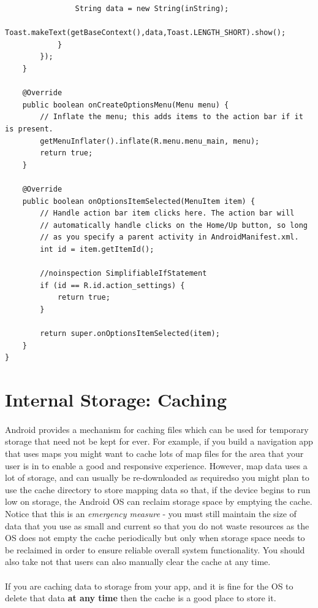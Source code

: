 \documentclass[12pt, a4paper, twoside]{book}
\begin{document}
\begin{lstlisting}
                String data = new String(inString);
                Toast.makeText(getBaseContext(),data,Toast.LENGTH_SHORT).show();
            }
        });
    }

    @Override
    public boolean onCreateOptionsMenu(Menu menu) {
        // Inflate the menu; this adds items to the action bar if it is present.
        getMenuInflater().inflate(R.menu.menu_main, menu);
        return true;
    }

    @Override
    public boolean onOptionsItemSelected(MenuItem item) {
        // Handle action bar item clicks here. The action bar will
        // automatically handle clicks on the Home/Up button, so long
        // as you specify a parent activity in AndroidManifest.xml.
        int id = item.getItemId();

        //noinspection SimplifiableIfStatement
        if (id == R.id.action_settings) {
            return true;
        }

        return super.onOptionsItemSelected(item);
    }
}
\end{lstlisting}

\section{Internal Storage: Caching}
\paragraph{} Android provides a mechanism for caching files which can be used for temporary storage that need not be kept for ever. For example, if you build a navigation app that uses maps you might want to cache lots of map files for the area that your user is in to enable a good and responsive experience. However, map data uses a lot of storage, and can usually be re-downloaded as requiredso you might plan to use the cache directory to store mapping data so that, if the device begins to run low on storage, the Android OS can reclaim storage space by emptying the cache. Notice that this is an {\emph{emergency measure}} - you must still maintain the size of data that you use as small and current so that you do not waste resources as the OS does not empty the cache periodically but only when storage space needs to be reclaimed in order to ensure reliable overall system functionality. You should also take not that users can also manually clear the cache at any time.

\paragraph{} If you are caching data to storage from your app, and it is fine for the OS to delete that data {\bf{at any time}} then the cache is a good place to store it.
\end{document}
